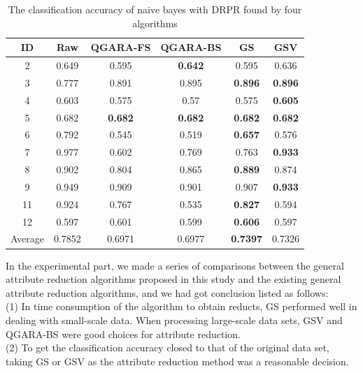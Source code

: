 \documentclass[review]{elsarticle}
\begin{document}
		
		\begin{table}[htbp]
			\centering
			\caption{The classification accuracy of naive bayes with DRPR found by four algorithms}
			\begin{tabular}{cccccc}
				\hline
				ID    & Raw   & QGARA-FS & QGARA-BS & GS    & GSV \\\hline
				2     & 0.649 & 0.595 & \textbf{0.642} & 0.595 & 0.636 \\
				3     & 0.777 & 0.891 & 0.895 & \textbf{0.896} & \textbf{0.896} \\
				4     & 0.603 & 0.575 & 0.57  & 0.575 & \textbf{0.605} \\
				5     & 0.682 & \textbf{0.682} & \textbf{0.682} & \textbf{0.682} & \textbf{0.682} \\
				6     & 0.792 & 0.545 & 0.519 & \textbf{0.657} & 0.576 \\
				7     & 0.977 & 0.602 & 0.769 & 0.763 & \textbf{0.933} \\
				8     & 0.902 & 0.804 & 0.865 & \textbf{0.889} & 0.874 \\
				9     & 0.949 & 0.909 & 0.901 & 0.907 & \textbf{0.933} \\
				11    & 0.924 & 0.767 & 0.535 & \textbf{0.827} & 0.594 \\
				12    & 0.597 & 0.601 & 0.599 & \textbf{0.606} & 0.597 \\\hline
				Average & 0.7852 & 0.6971 & 0.6977 & \textbf{0.7397} & 0.7326 \\\hline
			\end{tabular}%
			\label{canbd}%
		\end{table}%

	\par In the experimental part, we made a series of comparisons between the general attribute reduction algorithms proposed in this study and the existing general attribute reduction algorithms, and we had got conclusion listed as follows:
	\\\indent\rm{(1)} In time consumption of the algorithm to obtain reducts, GS performed well in dealing with small-scale data. When processing large-scale data sets, GSV and QGARA-BS were good choices for attribute reduction.
	\\\indent\rm{(2)} To get the classification accuracy closed to that of the original data set, taking GS or GSV as the attribute reduction method was a reasonable decision.
		
\end{document}
